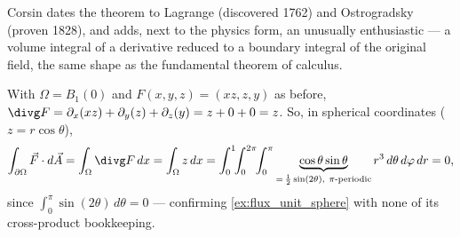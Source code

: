 \begin{ainote}
Corsin dates the theorem to Lagrange (discovered 1762) and Ostrogradsky (proven 1828), and
adds, next to the physics form, an unusually enthusiastic  --- a volume
integral of a derivative reduced to a boundary integral of the original field, the same shape
as the fundamental theorem of calculus.

\begin{center}
\end{center}
\end{ainote}

\begin{example}
\label{ex:flux_unit_sphere_via_divergence}
With $\Omega = B_1(0)$ and $F(x,y,z) = (xz,z,y)$ as before, $\divg F = \partial_x(xz) +
\partial_y(z) + \partial_z(y) = z + 0 + 0 = z$. So, in spherical coordinates ($z =
r\cos\theta$),
\[
\int_{\partial\Omega} \vec F\cdot d\vec A = \int_\Omega \divg F\,dx = \int_\Omega z\,dx
  = \int_0^1\!\!\int_0^{2\pi}\!\!\int_0^\pi \underbrace{\cos\theta\sin\theta}_{=\,\frac12\sin(2\theta),\
    \pi\text{-periodic}} r^3\,d\theta\,d\varphi\,dr = 0,
\]
since $\int_0^\pi \sin(2\theta)\,d\theta = 0$ --- confirming \cref{ex:flux_unit_sphere} with
none of its cross-product bookkeeping.
\end{example}

